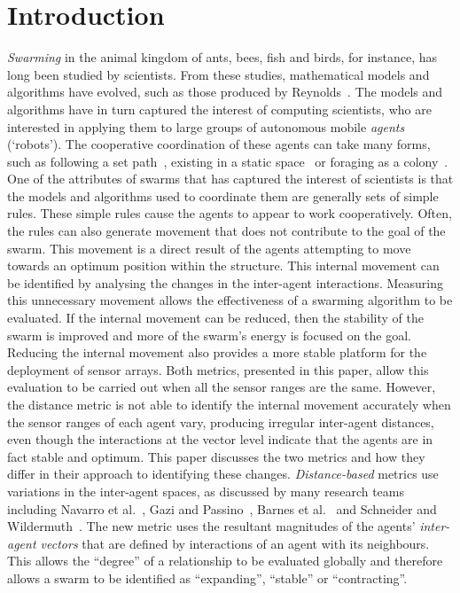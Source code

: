 \documentclass{ieeeaccess}
\begin{document}
\titlepgskip=-15pt
\maketitle


\section{Introduction\label{sec:intro}}


\textit{Swarming} in the animal kingdom of ants, bees, fish and birds, for
instance, has long been studied by scientists. From these studies, mathematical
models and algorithms have evolved, such as those produced by
Reynolds~\cite{REY:87}. The models and algorithms have in turn captured the
interest of computing scientists, who are interested in applying them to large
groups of autonomous mobile \textit{agents} (`robots'). The cooperative
coordination of these agents can take many forms, such as following a set
path~\cite{HCS:09}, existing in a static space~\cite{EP:10, GP:02, GP:04} or
foraging as a colony~\cite{HER:11, GK:07}. One of the attributes of swarms that
has captured the interest of scientists is that the models and algorithms used
to coordinate them are generally sets of simple rules. These simple rules cause
the agents to appear to work cooperatively. Often, the rules can also generate
movement that does not contribute to the goal of the swarm. This movement is a
direct result of the agents attempting to move towards an optimum position
within the structure. This internal movement can be identified by analysing the
changes in the inter-agent interactions. Measuring this unnecessary movement
allows the effectiveness of a swarming algorithm to be evaluated. If the
internal movement can be reduced, then the stability of the swarm is improved
and more of the swarm's energy is focused on the goal. Reducing the internal
movement also provides a more stable platform for the deployment of sensor
arrays. Both metrics, presented in this paper, allow this evaluation to be
carried out when all the sensor ranges are the same. However, the distance metric
is not able to identify the internal movement accurately when the sensor ranges
of each agent vary, producing irregular inter-agent distances, even though the
interactions at the vector level indicate that the agents are in fact stable
and optimum. This paper discusses the two metrics and how they differ in their
approach to identifying these changes. \textit{Distance-based} metrics use
variations in the inter-agent spaces, as discussed by many research teams
including Navarro et al.~\cite{NIM:09}, Gazi and Passino~\cite{GP:02,GP:04},
Barnes et al.~\cite{BAF:06} and Schneider and Wildermuth~\cite{SW:03}. The new
metric uses the resultant magnitudes of the agents' \textit{inter-agent
vectors} that are defined by interactions of an agent with its neighbours. This
allows the ``degree'' of a relationship to be evaluated globally and therefore
allows a swarm to be identified as ``expanding'', ``stable'' or
``contracting''. 
\end{document}
